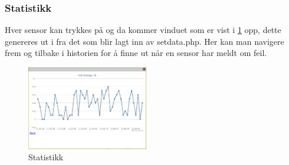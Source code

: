 \subsubsection{Statistikk}
Hver sensor kan trykkes på og da kommer vinduet som er vist i \ref{stats} opp, dette genereres ut i fra det som blir lagt inn av setdata.php. Her kan man navigere frem og tilbake i historien for å finne ut når en sensor har meldt om feil.
\begin{figure}[H]
\caption{Statistikk} 
\label{stats}
\includegraphics[width=200px]{images/stat.png}
\end{figure}


